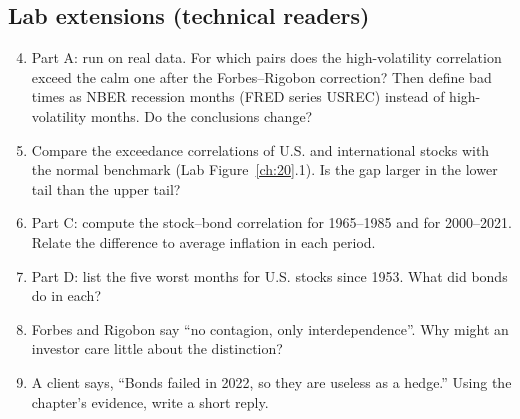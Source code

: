 \subsection*{Lab extensions (technical readers)}

\begin{enumerate}
  \setcounter{enumi}{3}
  \item Part A: run on real data. For which pairs does the high-volatility correlation exceed the calm one after the Forbes--Rigobon correction? Then define bad times as NBER recession months (FRED series USREC) instead of high-volatility months. Do the conclusions change?
  \item Compare the exceedance correlations of U.S. and international stocks with the normal benchmark (Lab Figure~\ref{ch:20}.1). Is the gap larger in the lower tail than the upper tail?
  \item Part C: compute the stock--bond correlation for 1965--1985 and for 2000--2021. Relate the difference to average inflation in each period.
  \item Part D: list the five worst months for U.S. stocks since 1953. What did bonds do in each?
  \item Forbes and Rigobon say ``no contagion, only interdependence''. Why might an investor care little about the distinction?
  \item A client says, ``Bonds failed in 2022, so they are useless as a hedge.'' Using the chapter's evidence, write a short reply.
\end{enumerate}
